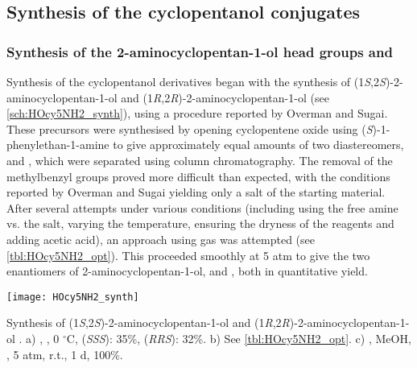 \subsection{Synthesis of the cyclopentanol conjugates\label{sec:HOcy5}}

\subsubsection{Synthesis of the 2-aminocyclopentan-1-ol head groups  and  \label{sec:HOcy5NH2}}

Synthesis of the cyclopentanol derivatives began with the synthesis of (1\textit{S},2\textit{S})-2-aminocyclopentan-1-ol  and (1\textit{R},2\textit{R})-2-aminocyclopentan-1-ol  (see \ref{sch:HOcy5NH2_synth}), using a procedure reported by Overman and Sugai\cite{Aube1992,Overman1985,Overman1985a}.
These precursors were synthesised by opening cyclopentene oxide  using (\textit{S})-1-phenylethan-1-amine  to give approximately equal amounts of two diastereomers,  and , which were separated using column chromatography. 
The removal of the methylbenzyl groups proved more difficult than expected, with the conditions reported by Overman and Sugai\cite{Overman1985} yielding only a salt of the starting material.
After several attempts under various conditions (including using the free amine vs. the salt, varying the temperature, ensuring the dryness of the reagents and adding acetic acid), an approach using  gas was attempted (see \ref{tbl:HOcy5NH2_opt}). This proceeded smoothly at 5 atm to give the two enantiomers of 2-aminocyclopentan-1-ol,  and , both in quantitative yield.

\begin{scheme}[H]
	\begin{center}
		\texttt{[image: HOcy5NH2\_synth]}
		\caption{Synthesis of (1\textit{S},2\textit{S})-2-aminocyclopentan-1-ol  and (1\textit{R},2\textit{R})-2-aminocyclopentan-1-ol .
		a) , , 0 $^\circ$C,  
		 (\textit{SSS}): 35\%,
		 (\textit{RRS}): 32\%.
		b) See \ref{tbl:HOcy5NH2_opt}.
		c) , MeOH, , 5 atm, r.t., 1 d, 100\%.
		\label{sch:HOcy5NH2_synth}}
	\end{center}
\end{scheme}


